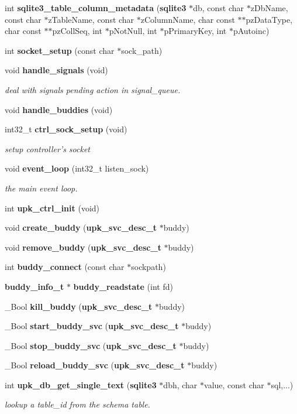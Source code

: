 \begin{DoxyCompactItemize}
int {\bf sqlite3\_\-table\_\-column\_\-metadata} ({\bf sqlite3} $\ast$db, const char $\ast$zDbName, const char $\ast$zTableName, const char $\ast$zColumnName, char const $\ast$$\ast$pzDataType, char const $\ast$$\ast$pzCollSeq, int $\ast$pNotNull, int $\ast$pPrimaryKey, int $\ast$pAutoinc)
\item 
int {\bf socket\_\-setup} (const char $\ast$sock\_\-path)
\item 
void {\bf handle\_\-signals} (void)
\begin{DoxyCompactList}\small\item\em deal with signals pending action in signal\_\-queue. \end{DoxyCompactList}\item 
void {\bf handle\_\-buddies} (void)
\item 
int32\_\-t {\bf ctrl\_\-sock\_\-setup} (void)
\begin{DoxyCompactList}\small\item\em setup controller's socket \end{DoxyCompactList}\item 
void {\bf event\_\-loop} (int32\_\-t listen\_\-sock)
\begin{DoxyCompactList}\small\item\em the main event loop. \end{DoxyCompactList}\item 
int {\bf upk\_\-ctrl\_\-init} (void)
\item 
void {\bf create\_\-buddy} ({\bf upk\_\-svc\_\-desc\_\-t} $\ast$buddy)
\item 
void {\bf remove\_\-buddy} ({\bf upk\_\-svc\_\-desc\_\-t} $\ast$buddy)
\item 
int {\bf buddy\_\-connect} (const char $\ast$sockpath)
\item 
{\bf buddy\_\-info\_\-t} $\ast$ {\bf buddy\_\-readstate} (int fd)
\item 
\_\-Bool {\bf kill\_\-buddy} ({\bf upk\_\-svc\_\-desc\_\-t} $\ast$buddy)
\item 
\_\-Bool {\bf start\_\-buddy\_\-svc} ({\bf upk\_\-svc\_\-desc\_\-t} $\ast$buddy)
\item 
\_\-Bool {\bf stop\_\-buddy\_\-svc} ({\bf upk\_\-svc\_\-desc\_\-t} $\ast$buddy)
\item 
\_\-Bool {\bf reload\_\-buddy\_\-svc} ({\bf upk\_\-svc\_\-desc\_\-t} $\ast$buddy)
\item 
int {\bf upk\_\-db\_\-get\_\-single\_\-text} ({\bf sqlite3} $\ast$dbh, char $\ast$value, const char $\ast$sql,...)
\begin{DoxyCompactList}\small\item\em lookup a table\_\-id from the schema table. \end{DoxyCompactList}\item 

\end{DoxyCompactItemize}
